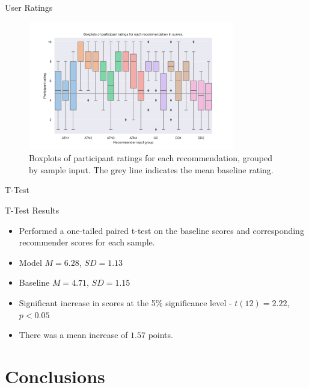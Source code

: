\documentclass{beamer}
\begin{document}
\begin{frame}{User Ratings}
    \begin{figure}[!htb]
        \centering
        \includegraphics[width=0.8\textwidth]{graphics/all_recommendations}
        \caption{Boxplots of participant ratings for each recommendation, grouped by sample input. The grey line 
        indicates the mean baseline rating.}\label{fig:allrec}
    \end{figure}
\end{frame}

\begin{frame}{T-Test}
    \begin{block}{T-Test Results}
        \begin{itemize}
            \item Performed a one-tailed paired t-test on the baseline scores and corresponding recommender scores for each sample.
            \item Model $M=6.28$, $SD=1.13$
            \item Baseline $M=4.71$, $SD=1.15$
            \item Significant increase in scores at the 5\% significance level - $t(12) = 2.22$, $p<0.05$
            \item There was a mean increase of $1.57$ points.
        \end{itemize}
    \end{block}
\end{frame}


\section{Conclusions} 
\end{document}
